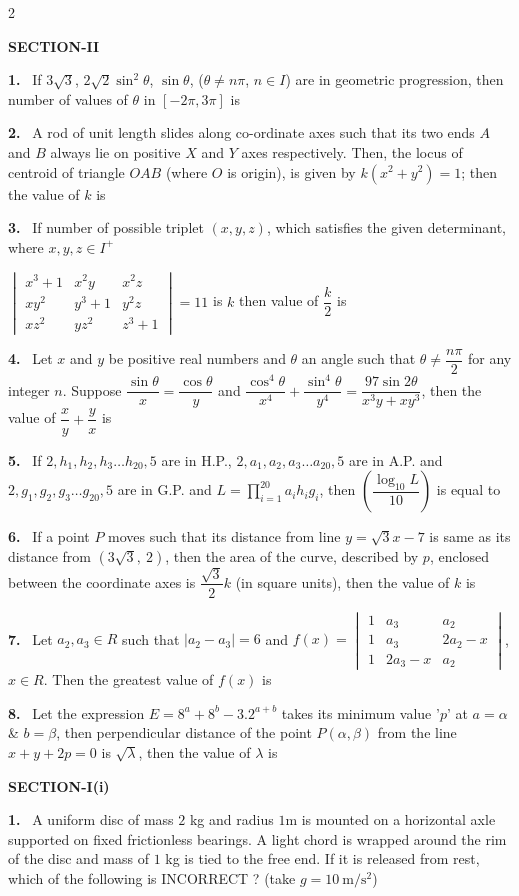\documentclass[10pt]{extarticle}
\newcommand{\papersec}[1]{\par\bigskip{\centering\Large\bfseries PAPER-#1\par}\medskip}
\newcommand{\partsec}[2]{\par\medskip\noindent{\large\bfseries PART-#1: #2}\par\smallskip}
\newcommand{\sect}[1]{\par\smallskip\noindent\textbf{#1}\par}
\newcommand{\qn}[1]{\par\smallskip\noindent\textbf{#1.}~}
\newenvironment{qoptions}{\begin{itemize}[leftmargin=1.8em,itemsep=1pt,topsep=2pt,label={}]}{\end{itemize}}
\begin{document}
\begin{multicols}{2}
\begin{qoptions}
\end{qoptions}
\sect{SECTION-II}
\qn{1} If $3\sqrt3$, $2\sqrt2\sin^2\theta$, $\sin\theta$, ($\theta\neq n\pi$, $n\in I$) are in geometric progression, then number of values of $\theta$ in $[-2\pi,3\pi]$ is
\qn{2} A rod of unit length slides along co-ordinate axes such that its two ends $A$ and $B$ always lie on positive $X$ and $Y$ axes respectively. Then, the locus of centroid of triangle $OAB$ (where $O$ is origin), is given by $k\left(x^2+y^2\right)=1$; then the value of $k$ is
\qn{3} If number of possible triplet $(x,y,z)$, which satisfies the given determinant, where $x,y,z\in I^+$\par
$\begin{vmatrix}x^3+1&x^2y&x^2z\\xy^2&y^3+1&y^2z\\xz^2&yz^2&z^3+1\end{vmatrix}=11$ is $k$ then value of $\dfrac k2$ is
\qn{4} Let $x$ and $y$ be positive real numbers and $\theta$ an angle such that $\theta\neq\dfrac{n\pi}2$ for any integer $n$. Suppose $\dfrac{\sin\theta}{x}=\dfrac{\cos\theta}{y}$ and $\dfrac{\cos^4\theta}{x^4}+\dfrac{\sin^4\theta}{y^4}=\dfrac{97\sin2\theta}{x^3y+xy^3}$, then the value of $\dfrac xy+\dfrac yx$ is
\qn{5} If $2,h_1,h_2,h_3\ldots h_{20},5$ are in H.P., $2,a_1,a_2,a_3\ldots a_{20},5$ are in A.P. and $2,g_1,g_2,g_3\ldots g_{20},5$ are in G.P. and $L=\displaystyle\prod_{i=1}^{20}a_ih_ig_i$, then $\left(\dfrac{\log_{10}L}{10}\right)$ is equal to
\qn{6} If a point $P$ moves such that its distance from line $y=\sqrt3x-7$ is same as its distance from $\left(3\sqrt3,\ 2\right)$, then the area of the curve, described by $p$, enclosed between the coordinate axes is $\dfrac{\sqrt3}{2}k$ (in square units), then the value of $k$ is
\qn{7} Let $a_2,a_3\in R$ such that $|a_2-a_3|=6$ and $f(x)=\begin{vmatrix}1&a_3&a_2\\1&a_3&2a_2-x\\1&2a_3-x&a_2\end{vmatrix}$, $x\in R$. Then the greatest value of $f(x)$ is
\qn{8} Let the expression $E=8^a+8^b-3.2^{a+b}$ takes its minimum value '$p$' at $a=\alpha$ \& $b=\beta$, then perpendicular distance of the point $P(\alpha,\beta)$ from the line $x+y+2p=0$ is $\sqrt\lambda$, then the value of $\lambda$ is
\papersec{2}
\partsec{1}{PHYSICS}
\sect{SECTION-I(i)}
\qn{1} A uniform disc of mass $2$ kg and radius $1$m is mounted on a horizontal axle supported on fixed frictionless bearings. A light chord is wrapped around the rim of the disc and mass of $1$ kg is tied to the free end. If it is released from rest, which of the following is INCORRECT ? (take $g=10\ \mathrm{m/s^2}$)

\end{multicols}
\end{document}
